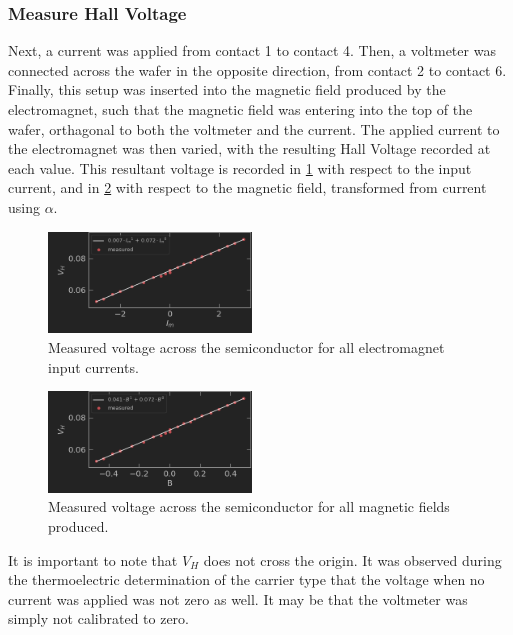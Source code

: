 \documentclass[aps,prl,reprint]{revtex4-2}
\begin{document}
\subsubsection{Measure Hall Voltage}

Next, a current was applied from contact 1 to contact 4. 
Then, a voltmeter was connected across the wafer in the 
opposite direction, from contact 2 to contact 6. Finally, this setup was inserted into the
magnetic field produced by the electromagnet, such that the magnetic field was entering into
the top of the wafer, orthagonal to both the voltmeter and the current. The applied current to 
the electromagnet was then varied, with the resulting Hall Voltage recorded at each value. This
resultant voltage is recorded in \ref{V_h_I} with respect to the input current, and in \ref{V_h_B}
with respect to the magnetic field, transformed from current using $\alpha$. \\

\begin{figure}[h]
	\begin{center}
		\includegraphics[width=0.48\textwidth]{../Images/l2_d_4a_all.png}
	\end{center}
	\caption{\label{V_h_I} Measured voltage across the semiconductor for all electromagnet 
	input currents. }
\end{figure}

\begin{figure}[h]
	\begin{center}
		\includegraphics[width=0.48\textwidth]{../Images/l2_d_4b.png}
	\end{center}
	\caption{\label{V_h_B} Measured voltage across the semiconductor for all magnetic fields
		produced. }
\end{figure}

It is important to note that $V_H$ does not cross the origin. It was observed during the
thermoelectric determination of the carrier type that the voltage when no current was applied
was not zero as well. It may be that the voltmeter was simply not calibrated to zero.
\end{document}
